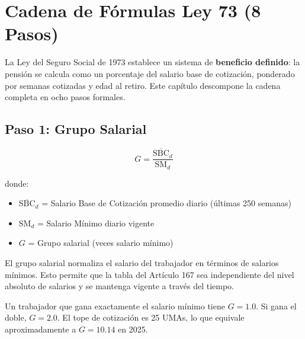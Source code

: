 \documentclass[11pt,a4paper]{report}
\theoremstyle{remark}
\begin{document}
\chapter{Cadena de F\'ormulas Ley 73 (8 Pasos)}

La Ley del Seguro Social de 1973 establece un sistema de \textbf{beneficio definido}: la pensi\'on se calcula como un porcentaje del salario base de cotizaci\'on, ponderado por semanas cotizadas y edad al retiro. Este cap\'itulo descompone la cadena completa en ocho pasos formales.

\section{Paso 1: Grupo Salarial}

\begin{tcolorbox}[colback=blue!5!white, colframe=blue!75!black, title=\textbf{Definici\'on Formal}]
\begin{equation}
G = \frac{\overline{\text{SBC}}_d}{\text{SM}_d}
\label{eq:grupo_salarial}
\end{equation}

donde:
\begin{itemize}
  \item $\overline{\text{SBC}}_d$ = Salario Base de Cotizaci\'on promedio diario (\'ultimas 250 semanas)
  \item $\text{SM}_d$ = Salario M\'inimo diario vigente
  \item $G$ = Grupo salarial (veces salario m\'inimo)
\end{itemize}
\end{tcolorbox}

\begin{tcolorbox}[colback=green!5!white, colframe=green!50!black, title=\textbf{Intuici\'on}]
El grupo salarial normaliza el salario del trabajador en t\'erminos de salarios m\'inimos. Esto permite que la tabla del Art\'iculo 167 sea independiente del nivel absoluto de salarios y se mantenga vigente a trav\'es del tiempo.

Un trabajador que gana exactamente el salario m\'inimo tiene $G = 1.0$. Si gana el doble, $G = 2.0$. El tope de cotizaci\'on es 25 UMAs, lo que equivale aproximadamente a $G = 10.14$ en 2025.
\end{tcolorbox}
\end{document}
